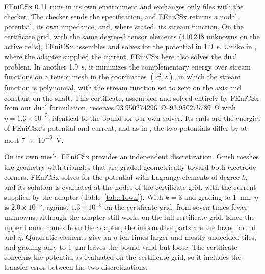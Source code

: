 \documentclass[11pt]{article}
\begin{document}
FEniCSx 0.11 \cite{baratta2023} runs in its own environment and exchanges only
files with the checker. The checker sends the specification, and FEniCSx returns a
nodal potential, its own impedance, and, where stated, its stream function. On the certificate
grid, with the same degree-3 tensor elements (410\,248 unknowns on the active cells),
FEniCSx assembles and solves for the potential in \SI{1.9}{s}. Unlike in
\cite{dovelos2026}, where the adapter supplied the current, FEniCSx here also solves
the dual problem. In another \SI{1.9}{s}, it minimizes the complementary energy over
stream functions on a tensor mesh in the coordinates $(r^2,z)$, in which the stream
function is polynomial, with the stream function set to zero on the axis and
constant on the shaft. This certificate, assembled and solved entirely by FEniCSx
from our dual formulation, receives \SIrange{93.950274296}{93.950275789}{\ohm} with
$\eta=1.3\times10^{-5}$, identical to the bound for our own solver. Its ends are the
energies of FEniCSx's potential and current, and as in \cite{dovelos2026}, the two potentials differ by at most \SI{7e-9}{V}.

On its own mesh, FEniCSx provides an independent discretization. Gmsh
\cite{geuzaine2009} meshes the geometry with triangles that are graded geometrically
toward both electrode corners. FEniCSx solves for the potential with Lagrange
elements of degree $k$, and its solution is evaluated at the nodes of the
certificate grid, with the current supplied by the adapter (Table~\ref{tab:e1own}).
With $k=3$ and grading to \SI{1}{nm}, $\eta$ is
$2.0\times10^{-5}$, against $1.3\times10^{-5}$ on the certificate grid, from seven
times fewer unknowns, although the adapter still works on the full certificate grid.
Since the upper bound comes from the adapter, the informative parts are the lower
bound and $\eta$. Quadratic elements give an $\eta$ ten times larger and mostly
undecided tiles, and grading only to \SI{1}{\micro m} leaves the bound valid but
loose. The certificate concerns the potential as evaluated on the certificate grid,
so it includes the transfer error between the two discretizations.
\end{document}

